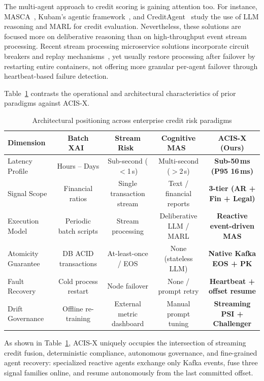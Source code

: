 \documentclass[conference]{IEEEtran}
\begin{document}
The multi-agent approach to credit scoring is gaining attention too. For instance, MASCA~\cite{jajoo2025masca}, Kubam's agentic framework~\cite{kubam2026agentic}, and CreditAgent~\cite{kou2025learning} study the use of LLM reasoning and MARL for credit evaluation. Nevertheless, these solutions are focused more on deliberative reasoning than on high-throughput event stream processing. Recent stream processing microservice solutions incorporate circuit breakers and replay mechanisms~\cite{beereddy2025selfhealing}, yet usually restore processing after failover by restarting entire containers, not offering more granular per-agent failover through heartbeat-based failure detection.

Table~\ref{tab:comparison} contrasts the operational and architectural characteristics of prior paradigms against ACIS-X.

\begin{table}[t]
\caption{Architectural positioning across enterprise credit risk paradigms}
\label{tab:comparison}
\centering\scriptsize
\begin{tabular}{@{}lcccc@{}}
\toprule
\textbf{Dimension} & \textbf{Batch XAI~\cite{chang2025explainable}} & \textbf{Stream Risk~\cite{parnerkar2025eda}} & \textbf{Cognitive MAS~\cite{jajoo2025masca,kubam2026agentic}} & \textbf{ACIS-X (Ours)} \\
\midrule
Latency Profile & Hours -- Days & Sub-second ($<$1\,s) & Multi-second ($>$2\,s) & \textbf{Sub-50\,ms (P95 16\,ms)} \\
Signal Scope & Financial ratios & Single transaction stream & Text / financial reports & \textbf{3-tier (AR + Fin + Legal)} \\
Execution Model & Periodic batch scripts & Stream processing & Deliberative LLM / MARL & \textbf{Reactive event-driven MAS} \\
Atomicity Guarantee & DB ACID transactions & At-least-once / EOS & None (stateless LLM) & \textbf{Native Kafka EOS + PK} \\
Fault Recovery & Cold process restart & Node failover & None / prompt retry & \textbf{Heartbeat + offset resume} \\
Drift Governance & Offline re-training & External metric dashboard & Manual prompt tuning & \textbf{Streaming PSI + Challenger} \\
\bottomrule
\end{tabular}
\end{table}

As shown in Table~\ref{tab:comparison}, ACIS-X uniquely occupies the intersection of streaming credit fusion, deterministic compliance, autonomous governance, and fine-grained agent recovery: specialized reactive agents exchange only Kafka events, fuse three signal families online, and resume autonomously from the last committed offset.
\end{document}
